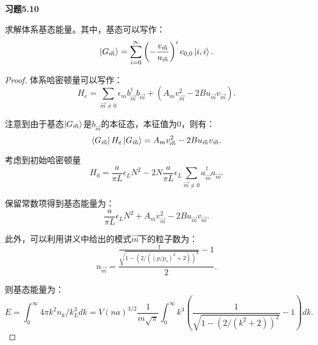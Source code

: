 \documentclass[reqno,a4paper,12pt]{amsart}
\begin{document}
\medskip

\textbf{习题5.10}

求解体系基态能量。其中，基态可以写作：
\[
	\ket{G_{\vec{m}}} = \sum_{i=0}^\infty \left( -\frac{v_{\vec{m}}}{u_{\vec{m}}} \right)^i c_{0,0} \ket{i,i}.
\]

\begin{proof}
体系哈密顿量可以写作：
\[
	H_e = \sum_{\vec{m}\neq 0} \epsilon_{m} b_{\vec{m}}^\dagger b_{\vec{m}} + (A_m v_{\vec{m}}^2 - 2Bu_{\vec{m}} v_{\vec{m}}).
\]

注意到由于基态$\ket{G_{\vec{m}}}$是$b_{\vec{m}}$的本征态，本征值为0，则有：
\[
	\bra{G_{\vec{m}}} H_e \ket{G_{\vec{m}}} = A_m v_{\vec{m}}^2 - 2Bu_{\vec{m}} v_{\vec{m}}.
\]

考虑到初始哈密顿量
\[
	H_0 = \frac{a}{\pi L} \epsilon_L N^2 - 2N\frac{a}{\pi L} \epsilon_L \sum_{\vec{m}\neq 0} a^\dagger_{\vec{m}} a_{\vec{m}}.
\]

保留常数项得到基态能量为：
\[
	\frac{a}{\pi L} \epsilon_L N^2 + A_m v_{\vec{m}}^2 - 2Bu_{\vec{m}} v_{\vec{m}}.
\]

此外，可以利用讲义中给出的模式$\vec{m}$下的粒子数为：
\[
	n_{\vec{m}} = \frac{\frac{1}{\sqrt{1-(2/((p/p_s)^2+2))^2}} - 1}{2}.
\]

则基态能量为：
\[
	E = \int_0^\infty 4\pi k^2 n_k /k_L^3 dk = V(na)^{3/2} \frac{1}{m\sqrt{\pi}} \int_0^\infty k^4 \left( \frac{1}{\sqrt{1-(2/(k^2+2))^2}} - 1 \right) dk.
\]
\end{proof}
\end{document}
